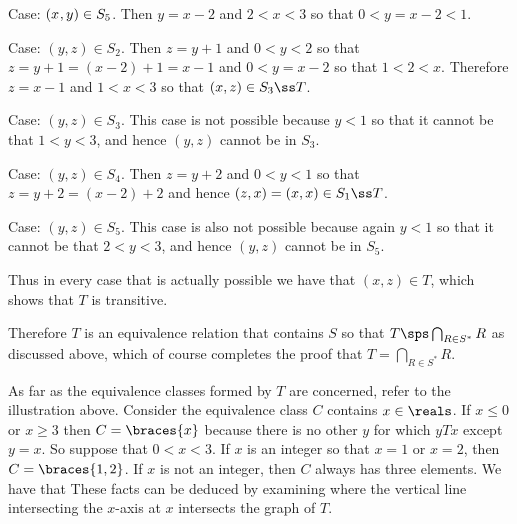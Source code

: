 {{    Case: $(x_{}, y_{}) \in S_5$.
    Then $y=x-2$ and $2 < x < 3$ so that $0 < y=x-2 < 1$.
    \begin{indpar}
      Case: $(y,z) \in S_2$.
      Then $z = y+1$ and $0 < y < 2$ so that $z = y+1 = (x-2) + 1 = x-1$ and $0 < y = x-2$ so that $1 < 2 < x$.
      Therefore $z=x-1$ and $1 < x < 3$ so that $(x,z) \in S_3 \ss T$.

      Case: $(y,z) \in S_3$.
      This case is not possible because $y < 1$ so that it cannot be that $1 < y < 3$, and hence $(y,z)$ cannot be in $S_3$.

      Case: $(y,z) \in S_4$.
      Then $z = y+2$ and $0 < y < 1$ so that $z = y+2 = (x-2)+2$ and hence $(z,x) = (x,x) \in S_1 \ss T$.

      Case: $(y,z) \in S_5$.
      This case is also not possible because again $y < 1$ so that it cannot be that $2 < y < 3$, and hence $(y,z)$ cannot be in $S_5$.
    \end{indpar}

    Thus in every case that is actually possible we have that $(x,z) \in T$, which shows that $T$ is transitive.

    Therefore $T$ is an equivalence relation that contains $S$ so that $T \sps \bigcap_{R \in S^*} R$ as discussed above, which of course completes the proof that $T = \bigcap_{R \in S^*} R$.
  }

  As far as the equivalence classes formed by $T$ are concerned, refer to the illustration above.
  Consider the equivalence class $C$ contains $x \in \reals$.
  If $x \leq 0$ or $x \geq 3$ then $C = \braces{x}$ because there is no other $y$ for which $yTx$ except $y=x$.
  So suppose that $0 < x < 3$.
  If $x$ is an integer so that $x = 1$ or $x = 2$, then $C = \braces{1,2}$.
  If $x$ is not an integer, then $C$ always has three elements.
  We have that
  These facts can be deduced by examining where the vertical line intersecting the $x$-axis at $x$ intersects the graph of $T$.
}
